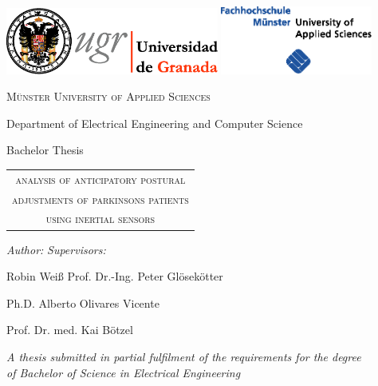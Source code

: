 \begin{titlepage}
\label{ch:titlepage}

\begin{center}

\includegraphics[width=7cm]{images/universidad_de_granada.eps}
	\hfill
\includegraphics[width=5cm]{images/fh-muenster.eps}
	\hspace{0.3cm} 

\vspace{2.5cm}

{\large \textsc{Münster University of Applied Sciences}}

Department of Electrical Engineering and Computer Science

\vspace{1cm}

{\Large Bachelor Thesis}

\vspace{0.8cm}

\begin{huge}
	\renewcommand{\arraystretch}{0.7}
	\begin{tabular}{c}
		\textsc{analysis of anticipatory postural} \\
	    \textsc{adjustments of parkinsons patients} \\
	    \textsc{using inertial sensors} \\
	\end{tabular}
\end{huge}

\end{center}

\vspace{1cm}

\textit{Author:}  \hfill \textit{Supervisors:}

Robin Weiß \hfill Prof. Dr.-Ing. Peter Gl\"{o}sek\"{o}tter 

\hfill Ph.D. Alberto Olivares Vicente

\hfill Prof. Dr. med. Kai B\"{o}tzel

\vspace{1cm}

\begin{center}
	
\textit{A thesis submitted in partial fulfilment of the requirements for the degree\\
of Bachelor of Science in Electrical Engineering}

\vfill

\monthname \: \the\year 

\end{center}

\end{titlepage}
